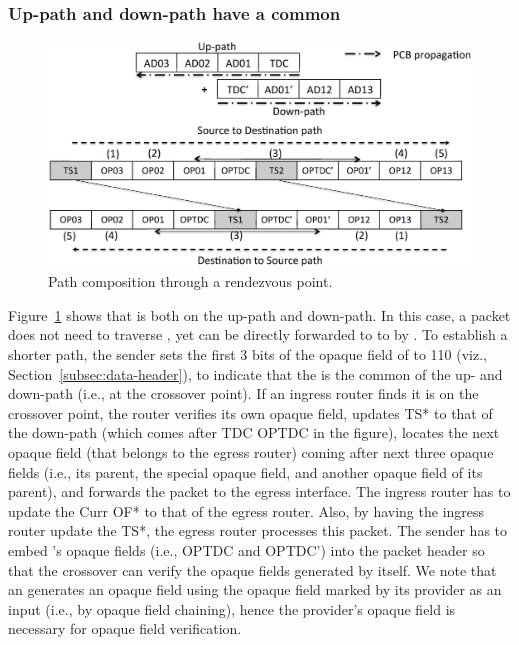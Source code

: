 \subsubsection{Up-path and down-path have a common \AD}

\begin{figure}[h]
\centering
\includegraphics[width=.9\columnwidth]{./fig/nex_fwd2.eps}
\caption{Path composition through a rendezvous point.}\label{fig:ex-fwd-crossover}
\end{figure}

\noindent Figure~\ref{fig:ex-fwd-crossover} shows that  is both on the up-path and down-path. In this case, a packet does not need to traverse \ISDC \AD, yet can be directly forwarded to to  by . To establish a shorter path, the sender sets the first 3 bits of the opaque field of  to 110 (viz., Section~\ref{subsec:data-header}), to indicate that the  is the common \AD of the up- and down-path (i.e., at the crossover point). If an ingress router finds it is on the crossover point, the router verifies its own opaque field, updates TS* to that of the down-path (which comes after TDC OPTDC in the figure), locates the next opaque field (that belongs to the egress router) coming after next three opaque fields (i.e., its parent, the special opaque field, and another opaque field of its parent), and forwards the packet to the egress interface. The ingress router has to update the Curr OF* to that of the egress router. Also, by having the ingress router update the TS*, the egress router processes this packet. The sender has to embed \ISDC's opaque fields (i.e., OPTDC and OPTDC') into the packet header so that the crossover \AD can verify the opaque fields generated by itself. We note that an \AD generates an opaque field using the opaque field marked by its provider as an input (i.e., by opaque field chaining), hence the provider's opaque field is necessary for opaque field verification.  


